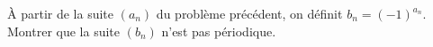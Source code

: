 À partir de la suite $(a_n)$ du problème précédent, on définit $b_n = (-1)^{a_n}$. Montrer que la suite $(b_n)$ n'est pas périodique.
